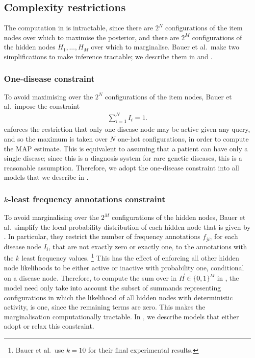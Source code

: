 \subsection{Complexity restrictions}

The computation in  is intractable, since 
there are $2^N$ configurations of the item nodes over which to maximise the
posterior, and there are $2^M$ configurations of the hidden nodes $H_1, \hdots,
H_M$ over which to marginalise.
%
Bauer et al.\ make two simplifications to make inference tractable; we describe
them in  and .

\subsubsection{One-disease constraint}
\label{subsubsec:odc}

To avoid maximising over the $2^N$ configurations of the item nodes, Bauer et al.\
impose the constraint
%
\begin{align}
    \sum_{i=1}^N I_i = 1. \label{eq:onehot}
\end{align}
%
 enforces the restriction that only one disease node may be
active given any query, and so the maximum is taken over $N$ one-hot
configurations, in order to compute the MAP estimate.
%
This is equivalent to assuming that a patient can have only a single disease;
%
since this is a diagnosis system for rare genetic diseases, this is a reasonable
assumption.
%
Therefore, we adopt the one-disease constraint into all models that we describe
in \Section{sec:models}.

\subsubsection{$k$-least frequency annotations constraint}
\label{subsubsec:kleast}

To avoid marginalising over the $2^M$ configurations of the hidden nodes,
Bauer et al.\ simplify the local probability distribution of each hidden node
that is given by \Equation{eq:lpdhids}.
%
In particular, they restrict the number of frequency annotations $f_{ji}$, for
each disease node $I_i$, that are not exactly zero or exactly one, to the
annotations with the $k$ least frequency values.
%
\footnote{
    Bauer et al.\ use $k=10$ for their final experimental results.
}
%
This has the effect of enforcing all other hidden node likelihoods
to be either active or inactive with probability one,
conditional on a disease node.
%
Therefore, to compute the sum over in $\vec{H} \in \{0, 1\}^M$ in
\Equation{eq:mapinf}, the model need only take into account the subset of
summands representing configurations in which the likelihood of all hidden nodes
with deterministic activity, is one, since the remaining terms are zero.
%
This makes the marginalisation computationally tractable.
%
In , we describe models that either adopt or relax this
constraint.

